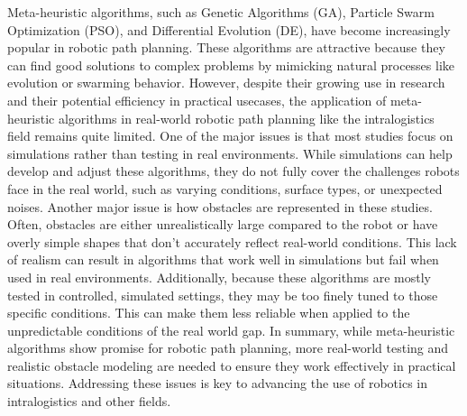 
Meta-heuristic algorithms, such as Genetic Algorithms (GA), Particle Swarm Optimization (PSO), and Differential 
Evolution (DE), have become increasingly popular in robotic path planning. These algorithms are attractive because 
they can find good solutions to complex problems by mimicking natural processes like evolution or swarming behavior.
However, despite their growing use in research and their potential efficiency in practical usecases, the application 
of meta-heuristic algorithms in real-world robotic path planning like the intralogistics field remains quite limited. 
One of the major issues is that most studies focus on simulations rather than 
testing in real environments. While simulations can help develop and adjust these algorithms, they do not fully 
cover the challenges robots face in the real world, such as varying conditions, surface types, or unexpected 
noises. Another major issue is how obstacles are represented in these studies. Often, obstacles are either unrealistically 
large compared to the robot or have overly simple shapes that don’t accurately reflect real-world conditions. This 
lack of realism can result in algorithms that work well in simulations but fail when used in real environments. Additionally, 
because these algorithms are mostly tested in controlled, simulated settings, they may be too finely 
tuned to those specific conditions. This can make them less reliable when applied to the unpredictable conditions 
of the real world gap. In summary, while meta-heuristic algorithms show promise for robotic path planning, more real-world 
testing and realistic obstacle modeling are needed to ensure they work effectively in practical situations. 
Addressing these issues is key to advancing the use of robotics in intralogistics and other fields.
\newpage
